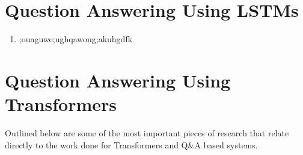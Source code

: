 \documentclass[12pt]{report}
\begin{document}
        \section{Question Answering Using LSTMs}\label{22}
        \begin{enumerate}
            \item \citep{haighextractive};ouaguwe;ughqawoug;akuhgdfk
        \end{enumerate}
        \section{Question Answering Using Transformers}\label{23}
        Outlined below are some of the most important pieces of research that relate directly to the work done for Transformers and Q\&A based systems.
        \begin{enumerate}


\end{enumerate}
\end{document}
